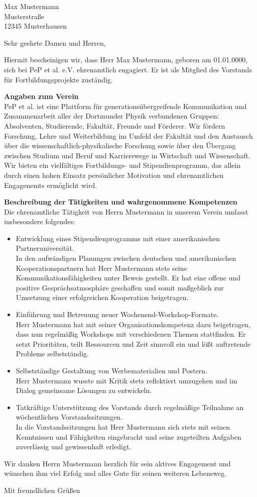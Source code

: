 \documentclass[
  pepbrief,
  fontsize=12pt,
  paper=a4,
  DIV=14,
  parskip=half,
  backaddress=false,
]{scrlttr2}
\author{Henning Moldenhauer}
\begin{document}
\begin{letter}{%
  Max Mustermann\\
  Musterstraße\\
  12345 Musterhausen%
}
\opening{Sehr geehrte Damen und Herren,}
Hiermit bescheinigen wir, dass Herr Max Mustermann, geboren am 01.01.0000, sich bei
PeP et al. e.V. ehrenamtlich engagiert. Er ist als Mitglied des Vorstands
für Fortbildungsprojekte zuständig.

\textbf{Angaben zum Verein}\\
PeP et al. ist eine Plattform für generationsübergreifende Kommunikation
und Zusammenarbeit aller der Dortmunder Physik verbundenen Gruppen: Absolventen,
Studierende, Fakultät, Freunde und Förderer.
Wir fördern Forschung, Lehre und Weiterbildung im Umfeld der Fakultät und den
Austausch über die wissenschaftlich-physikalische Forschung sowie über den
Übergang zwischen Studium und Beruf und Karrierewege in Wirtschaft und Wissenschaft.
Wir bieten ein vielfältiges Fortbildungs- und Stipendienprogramm, das allein durch
einen hohen Einsatz persönlicher Motivation und ehrenamtlichen Engagenemts ermöglicht
wird.

\textbf{Beschreibung der Tätigkeiten und wahrgenommene Kompetenzen}\\
Die ehrenamtliche Tätigkeit von Herrn Mustermann in unserem Verein umfasst
insbesondere folgendes:
\begin{itemize}
  \item Entwicklung eines Stipendienprogramms mit einer amerikanischen
	Partneruniversität.\\
	In den aufwändigen Planungen zwischen deutschen und amerikanischen
	Kooperationspartnern hat Herr Mustermann stets seine
	Kommunikationsfähigkeiten unter Beweis gestellt. Er hat eine offene
	und positive Gesprächsatmosphäre geschaffen und somit maßgeblich zur Umsetzung
  einer erfolgreichen Kooperation beigetragen.
  \item Einführung und Betreuung neuer Wochenend-Workshop-Formate.\\
	Herr Mustermann hat mit seiner Organisationskompetenz dazu beigetragen,
	dass nun regelmäßig Workshops mit verschiedenen Themen stattfinden.
	Er setzt Prioritäten, teilt Ressourcen und Zeit sinnvoll ein und
	lößt auftretende Probleme selbstständig.
  \item Selbstständige Gestaltung von Werbematerialien und Postern.\\
	Herr Mustermann wusste mit Kritik stets reflektiert umzugehen und im Dialog
  gemeinsame Lösungen zu entwickeln.
  \item Tatkräftige Unterstützung des Vorstands durch regelmäßige Teilnahme an
	wöchentlichen Vorstandssitzungen.\\
	In die Vorstandssitzungen hat Herr Mustermann sich stets mit seinen
	Kenntnissen und Fähigkeiten eingebracht und seine zugeteilten Aufgaben
	zuverlässig und gewissenhaft erledigt.
\end{itemize}

Wir danken Herrn Mustermann herzlich für sein aktives Engagement und wünschen ihm
viel Erfolg und alles Gute für seinen weiteren Lebensweg.

\closing{Mit freundlichen Grüßen}

\end{letter}
\end{document}
